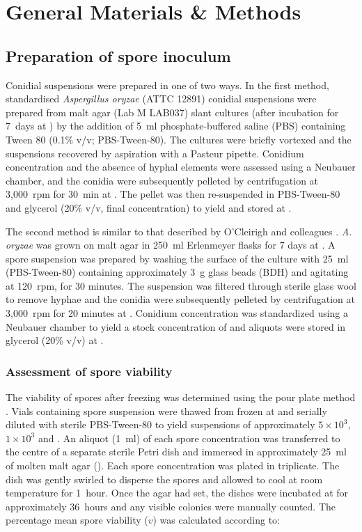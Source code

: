 \chapter{General Materials \& Methods}\label{ch:MaterialsMethods}

\section{Preparation of spore inoculum}\label{sec:InocPrep}

Conidial suspensions were prepared in one of two ways. In the first method, standardised \emph{Aspergillus oryzae} (ATTC 12891) conidial suspensions were prepared from malt agar (Lab M LAB037) slant cultures (after incubation for 7~days at ) by the addition of 5~ml phosphate-buffered saline (PBS) containing Tween 80 (0.1\% v/v; PBS-Tween-80). The cultures were briefly vortexed and the suspensions recovered by aspiration with a Pasteur pipette. Conidium concentration and the absence of hyphal elements were assessed using a Neubauer chamber, and the conidia were subsequently pelleted by centrifugation at 3,000~rpm for 30~min at . The pellet was then re-suspended in PBS-Tween-80 and glycerol (20\% v/v, final concentration) to yield  and stored at .

The second method is similar to that described by O'Cleirigh and colleagues \cite{ocleirigh2003}. \emph{A. oryzae} was grown on malt agar in 250~ml Erlenmeyer flasks for 7 days at . A spore suspension was prepared by washing the surface of the culture with 25~ml (PBS-Tween-80) containing approximately 3~g glass beads (BDH) and agitating at 120~rpm,  for 30 minutes. The suspension was filtered through sterile glass wool to remove hyphae and the conidia were subsequently pelleted by centrifugation at 3,000~rpm for 20 minutes at . Conidium concentration was standardized using a Neubauer chamber to yield a stock concentration of  and aliquots were stored in glycerol (20\% v/v) at .

\subsection{Assessment of spore viability}

The viability of spores after freezing was determined using the pour plate method \cite{thatcher1968}. Vials containing spore suspension were thawed from frozen at  and serially diluted with sterile PBS-Tween-80 to yield suspensions of approximately $5 \times 10^3$, $1 \times 10^3$ and . An aliquot (1~ml) of each spore concentration was transferred to the centre of a separate sterile Petri dish and immersed in approximately 25~ml of molten malt agar (). Each spore concentration was plated in triplicate. The dish was gently swirled to disperse the spores and allowed to cool at room temperature for 1~hour. Once the agar had set, the dishes were incubated at  for approximately 36~hours and any visible colonies were manually counted. The percentage mean spore viability ($v$) was calculated according to:

